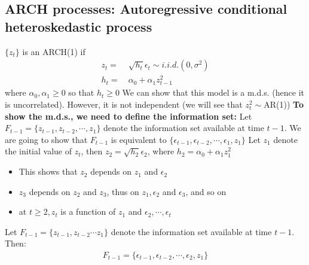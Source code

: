 \documentclass[a4paper,twoside,11pt]{article}
\begin{document}
\subsection{ARCH processes: Autoregressive conditional heteroskedastic process} 
$\{ z_t \}$ is an ARCH(1) if 
\begin{equation*}
\begin{aligned}
z_t =& \ \sqrt{h_t} \epsilon_t \sim i.i.d. (0,\sigma^2) \\
h_t =& \ \alpha_0 + \alpha_1 z_{t-1}^2
\end{aligned}
\end{equation*}
where $\alpha_0,\alpha_1 \ge 0$ so that $h_t \ge 0$
\newline
\newline
We can show that this model is a m.d.s. (hence it is uncorrelated). However, it is not independent (we will see that $z_t^2\sim$AR(1))
\newline
\textbf{To show the m.d.s., we need to define the information set:}
\newline
Let $F_{t-1} = \{ z_{t-1}, z_{t-2}, \cdots , z_1 \}$ denote the information set available at time $t-1$. 
\newline
\textmd{We are going to show that $F_{t-1}$ is equivalent to $\{\epsilon_{t-1}, \epsilon_{t-2}, \cdots, \epsilon_1, z_1 \}$}
\newline
\newline
Let $z_1$ denote the initial value of $z_t$, then $z_2 = \sqrt{h_2}\epsilon_2$, where $h_2 = \alpha_0 + \alpha_1 z_1^2$
\begin{itemize}
    \item This shows that $z_2$ depends on $z_1$ and $\epsilon_2$ 
    \item $z_3$ depends on $z_2$ and $z_3$, thus on $z_1,  \epsilon_2$ and $\epsilon_3$, and so on
    \item at $t \ge 2, z_t$ is a function of $z_1$ and $\epsilon_2, \cdots, \epsilon_t$
\end{itemize}
Let $F_{t-1} = \{ z_{t-1} , z_{t-2} \cdots z_1 \}$ denote the information set available at time $t-1$. Then: 
\begin{equation*}
\begin{aligned}
F_{t-1} = \{ \epsilon_{t-1}, \epsilon_{t-2}, \cdots, \epsilon_{2}, z_1 \}
\end{aligned}
\end{equation*}
\end{document}
